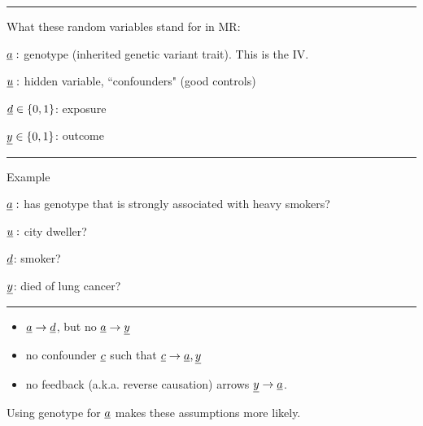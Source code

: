 \hrule\noindent What these random variables stand for in MR:

${\underline{a}}:$ genotype (inherited genetic variant trait).
This is the IV.

${\underline{u}}:$ hidden variable, ``confounders" (good
controls) 


${\underline{d}}\in\{0,1\}$: exposure

${\underline{y}}\in\{0,1\}$: outcome 

\hrule
\noindent  Example

${\underline{a}}:$ has genotype
that is strongly associated with heavy smokers?

${\underline{u}}:$ city dweller?


${\underline{d}}$: smoker?

${\underline{y}}$: died of lung cancer?



\hrule{}

\begin{itemize}
\item ${\underline{a}}\rightarrow {\underline{d}}$, but
no ${\underline{a}}\rightarrow {\underline{y}}$
\item
no confounder ${\underline{c}}$ such that ${\underline{c}}\rightarrow {\underline{a}}, {\underline{y}}$ 
\item 
no feedback
(a.k.a. reverse causation) arrows ${\underline{y}}\rightarrow {\underline{a}}$.
\end{itemize}

Using genotype for ${\underline{a}}$ makes
these assumptions more likely.
